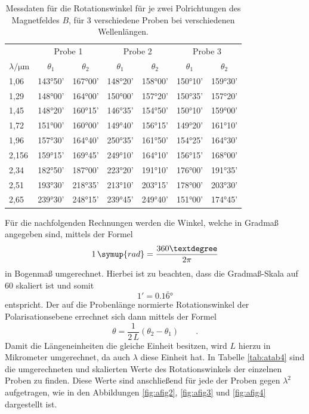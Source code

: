 \FloatBarrier
\begin{table}[h]
    \centering
    \caption{Messdaten für die Rotationswinkel für je zwei Polrichtungen des Magnetfeldes $B$, für 3 verschiedene Proben bei verschiedenen Wellenlängen.}
    \label{tab:atab3}
    \begin{tabular}{l c c c c c c}
        \toprule
        & \multicolumn{2}{c}{Probe 1} & \multicolumn{2}{c}{Probe 2} & \multicolumn{2}{c}{Probe 3} \\
        \cmidrule(lr){2-3}\cmidrule(lr){4-5}\cmidrule(lr){6-7}
        {$\lambda / \si{\micro\meter}$} & {$\theta_1$} & {$\theta_2$} & {$\theta_1$} & {$\theta_2$} & {$\theta_1$} & {$\theta_2$} \\
        \midrule

        1,06 & 143°50' & 167°00' & 148°20' & 158°00' & 150°10' & 159°30' \\
        1,29 & 148°00' & 164°00' & 150°00' & 157°20' & 150°35' & 157°20' \\
        1,45 & 148°20' & 160°15' & 146°35' & 154°50' & 150°10' & 159°00' \\
        1,72 & 151°00' & 160°00' & 149°40' & 156°15' & 149°20' & 161°10' \\
        1,96 & 157°30' & 164°40' & 250°35' & 161°50' & 154°25' & 164°30' \\
        2,156& 159°15' & 169°45' & 249°10' & 164°10' & 156°15' & 168°00' \\
        2,34 & 182°50' & 187°00' & 223°20' & 191°10' & 176°00' & 191°35' \\
        2,51 & 193°30' & 218°35' & 213°10' & 203°15' & 178°00' & 203°30' \\
        2,65 & 239°30' & 248°15' & 239°45' & 249°40' & 151°00' & 174°45' \\

        \bottomrule
    \end{tabular}
\end{table}
\FloatBarrier
\noindent

Für die nachfolgenden Rechnungen werden die Winkel, welche in Gradmaß angegeben sind, mittels der Formel
\begin{equation}
    1\, \symup{rad} = \frac{360°}{2\pi}
\end{equation}
in Bogenmaß umgerechnet. Hierbei ist zu beachten, dass die Gradmaß-Skala auf $60$ skaliert ist und somit
\begin{equation*}
    1' = 0.1\bar{6}°
\end{equation*}
entspricht. Der auf die Probenlänge normierte Rotationswinkel der Polarisationsebene errechnet sich dann mittels der Formel
\begin{equation}
    \theta = \frac{1}{2\, L}(\theta_2 - \theta_1) \qquad .
\end{equation}
Damit die Längeneinheiten die gleiche Einheit besitzen, wird $L$ hierzu in Mikrometer umgerechnet, da auch $\lambda$ diese Einheit hat.
In Tabelle \ref{tab:atab4} sind die umgerechneten und skalierten Werte des Rotationswinkels der einzelnen Proben zu finden. Diese Werte sind anschließend für jede der Proben gegen $\lambda^2$ 
aufgetragen, wie in den Abbildungen \ref{fig:afig2}, \ref{fig:afig3} und \ref{fig:afig4} dargestellt ist.

